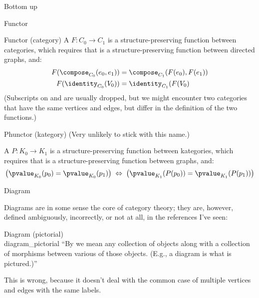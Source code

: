 \begin{plSection}{Bottom up}
\begin{plSection}{Functor}
\begin{plDefinition}{Functor (category)}{}
A  $F:C_0 \rightarrow C_1$ is 
a structure-preserving function
between categories, which requires that is a structure-preserving 
function between directed graphs, and:
\begin{align*}
  F(\compose_{C_0}(e_0,e_1)) & = \compose_{C_1}(F(e_0),F(e_1))\\
  F(\identity_{C_0}(V_0)) & = \identity_{C_1}(F(V_0)
\end{align*}
  (Subscripts on \compose and \identity 
  are usually dropped, but we might 
  encounter two categories that have the same vertices and edges,
  but differ in the definition of the two functions.)
\end{plDefinition}

\begin{plDefinition}{Phunctor (kategory)}{}
(Very unlikely to stick with this name.)

A  $P:K_0 \rightarrow K_1$ is 
a structure-preserving function
between kategories, which requires that is a structure-preserving 
function between graphs, and:
\begin{align*}
  \left( \pvalue_{K_0}(p_0) = \pvalue_{K_0}(p_1) \right)
  \; \Leftrightarrow \; 
  \left( \pvalue_{K_1}(P(p_0)) = \pvalue_{K_1}(P(p_1)) \right)
\end{align*}
\end{plDefinition}
\end{plSection}
\begin{plSection}{Diagram}
\label{sec:Diagram}

Diagrams are in some sense the core of category theory;
they are, however, defined ambiguously, incorrectly, 
or not at all, in the references I've seen:

\begin{plDefinition}
{Diagram (pictorial)\\
\textmd{
}}
{diagram_pictorial}
``By  we mean any collection of objects
along with a collection of morphisms between various of those
objects. (E.g., a diagram is what is pictured.)''~\cite{Geroch:1985:MathPhysics} 
\par
This is wrong, because it doesn't deal with the common
case of multiple vertices and edges with the same labels.
\end{plDefinition}


\end{plSection}
\end{plSection}
